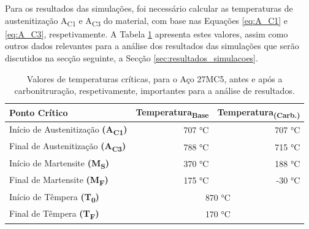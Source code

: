 \par
Para os resultados das simulações, foi necessário calcular as temperaturas de austenitização A\textsubscript{C1} e A\textsubscript{C3} do material, com base nas Equações \ref{eq:A_C1} e \ref{eq:A_C3}, respetivamente. A Tabela \ref{tab:temp_sim} apresenta estes valores, assim como outros dados relevantes para a análise dos resultados das simulações que serão discutidos na secção seguinte, a Secção \ref{sec:resultados_simulacoes}.
\begin{table}[htb]
    \centering
    \caption[Valores de temperatura importantes para a análise de resultados]%
    {Valores de temperaturas críticas, para o Aço 27MC5, antes e após a carbonitruração, respetivamente, importantes para a análise de resultados.}
    \label{tab:temp_sim}
    \begin{tabular}{lrr} 
    \toprule
    \textbf{Ponto Crítico}                  & \multicolumn{1}{c}{\textbf{Temperatura\textsubscript{Base}}} & \multicolumn{1}{c}{\textbf{Temperatura\textsubscript{(Carb.)}}}  \\ 
    \hline\hline
    Início de Austenitização \textbf{(A\textsubscript{C1})} & 707 °C                                            & 707 °C                                               \\
    Final de Austenitização \textbf{(A\textsubscript{C3})}  & 788 °C                                            & 715 °C                                               \\
    Início de Martensite \textbf{(M\textsubscript{S})}      & 370 °C                                            & 188 °C                                               \\
    Final de Martensite \textbf{(M\textsubscript{F})}       & 175 °C                                            & -30 °C                                               \\
    \hline
    Início de Têmpera \textbf{(T\textsubscript{0})}         & \multicolumn{2}{c}{870 °C}                                                                                \\
    Final de Têmpera \textbf{(T\textsubscript{F})}          & \multicolumn{2}{c}{170 °C}                                                                                \\
    \bottomrule
    \end{tabular}
    \end{table}
\newpage

